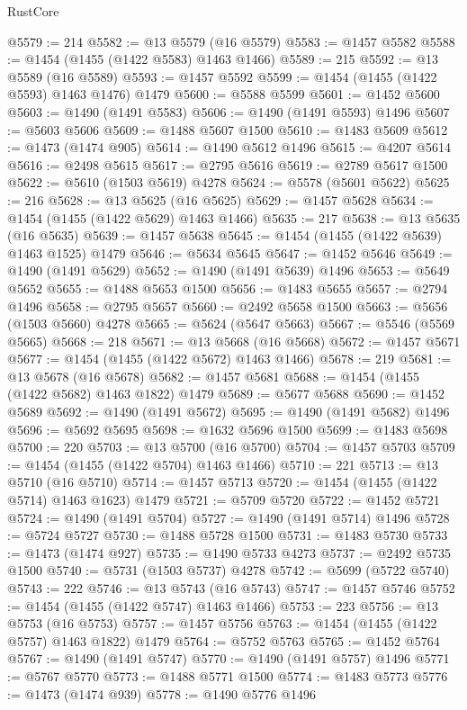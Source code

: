 \begin{lexlean}{RustCore}
\begin{coremodule}
@5579 := 214
@5582 := @13 @5579 (@16 @5579)
@5583 := @1457 @5582
@5588 := @1454 (@1455 (@1422 @5583) @1463 @1466)
@5589 := 215
@5592 := @13 @5589 (@16 @5589)
@5593 := @1457 @5592
@5599 := @1454 (@1455 (@1422 @5593) @1463 @1476) @1479
@5600 := @5588 @5599
@5601 := @1452 @5600
@5603 := @1490 (@1491 @5583)
@5606 := @1490 (@1491 @5593) @1496
@5607 := @5603 @5606
@5609 := @1488 @5607 @1500
@5610 := @1483 @5609
@5612 := @1473 (@1474 @905)
@5614 := @1490 @5612 @1496
@5615 := @4207 @5614
@5616 := @2498 @5615
@5617 := @2795 @5616
@5619 := @2789 @5617 @1500
@5622 := @5610 (@1503 @5619) @4278
@5624 := @5578 (@5601 @5622)
@5625 := 216
@5628 := @13 @5625 (@16 @5625)
@5629 := @1457 @5628
@5634 := @1454 (@1455 (@1422 @5629) @1463 @1466)
@5635 := 217
@5638 := @13 @5635 (@16 @5635)
@5639 := @1457 @5638
@5645 := @1454 (@1455 (@1422 @5639) @1463 @1525) @1479
@5646 := @5634 @5645
@5647 := @1452 @5646
@5649 := @1490 (@1491 @5629)
@5652 := @1490 (@1491 @5639) @1496
@5653 := @5649 @5652
@5655 := @1488 @5653 @1500
@5656 := @1483 @5655
@5657 := @2794 @1496
@5658 := @2795 @5657
@5660 := @2492 @5658 @1500
@5663 := @5656 (@1503 @5660) @4278
@5665 := @5624 (@5647 @5663)
@5667 := @5546 (@5569 @5665)
@5668 := 218
@5671 := @13 @5668 (@16 @5668)
@5672 := @1457 @5671
@5677 := @1454 (@1455 (@1422 @5672) @1463 @1466)
@5678 := 219
@5681 := @13 @5678 (@16 @5678)
@5682 := @1457 @5681
@5688 := @1454 (@1455 (@1422 @5682) @1463 @1822) @1479
@5689 := @5677 @5688
@5690 := @1452 @5689
@5692 := @1490 (@1491 @5672)
@5695 := @1490 (@1491 @5682) @1496
@5696 := @5692 @5695
@5698 := @1632 @5696 @1500
@5699 := @1483 @5698
@5700 := 220
@5703 := @13 @5700 (@16 @5700)
@5704 := @1457 @5703
@5709 := @1454 (@1455 (@1422 @5704) @1463 @1466)
@5710 := 221
@5713 := @13 @5710 (@16 @5710)
@5714 := @1457 @5713
@5720 := @1454 (@1455 (@1422 @5714) @1463 @1623) @1479
@5721 := @5709 @5720
@5722 := @1452 @5721
@5724 := @1490 (@1491 @5704)
@5727 := @1490 (@1491 @5714) @1496
@5728 := @5724 @5727
@5730 := @1488 @5728 @1500
@5731 := @1483 @5730
@5733 := @1473 (@1474 @927)
@5735 := @1490 @5733 @4273
@5737 := @2492 @5735 @1500
@5740 := @5731 (@1503 @5737) @4278
@5742 := @5699 (@5722 @5740)
@5743 := 222
@5746 := @13 @5743 (@16 @5743)
@5747 := @1457 @5746
@5752 := @1454 (@1455 (@1422 @5747) @1463 @1466)
@5753 := 223
@5756 := @13 @5753 (@16 @5753)
@5757 := @1457 @5756
@5763 := @1454 (@1455 (@1422 @5757) @1463 @1822) @1479
@5764 := @5752 @5763
@5765 := @1452 @5764
@5767 := @1490 (@1491 @5747)
@5770 := @1490 (@1491 @5757) @1496
@5771 := @5767 @5770
@5773 := @1488 @5771 @1500
@5774 := @1483 @5773
@5776 := @1473 (@1474 @939)
@5778 := @1490 @5776 @1496

\end{coremodule}
\end{lexlean}
